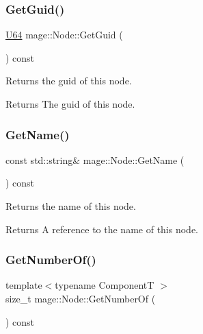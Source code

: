 \subsubsection{\texorpdfstring{Get\+Guid()}{GetGuid()}}
{\footnotesize\ttfamily \mbox{\hyperlink{namespacemage_a6672cf3c861707ce4a3235a3eb43941d}{U64}} mage\+::\+Node\+::\+Get\+Guid (\begin{DoxyParamCaption}{ }\end{DoxyParamCaption}) const\hspace{0.3cm}{\ttfamily [noexcept]}}

Returns the guid of this node.

\begin{DoxyReturn}{Returns}
The guid of this node. 
\end{DoxyReturn}
\mbox{\label{classmage_1_1_node_a66c1c1c76861ecb7d26252a9da865f63}} 
\subsubsection{\texorpdfstring{Get\+Name()}{GetName()}}
{\footnotesize\ttfamily const std\+::string\& mage\+::\+Node\+::\+Get\+Name (\begin{DoxyParamCaption}{ }\end{DoxyParamCaption}) const\hspace{0.3cm}{\ttfamily [noexcept]}}

Returns the name of this node.

\begin{DoxyReturn}{Returns}
A reference to the name of this node. 
\end{DoxyReturn}
\mbox{\label{classmage_1_1_node_a0cd486de1639d5af2618ba913124fbe6}} 
\subsubsection{\texorpdfstring{Get\+Number\+Of()}{GetNumberOf()}}
{\footnotesize\ttfamily template$<$typename ComponentT $>$ \\
size\+\_\+t mage\+::\+Node\+::\+Get\+Number\+Of (\begin{DoxyParamCaption}{ }\end{DoxyParamCaption}) const\hspace{0.3cm}{\ttfamily [noexcept]}}

